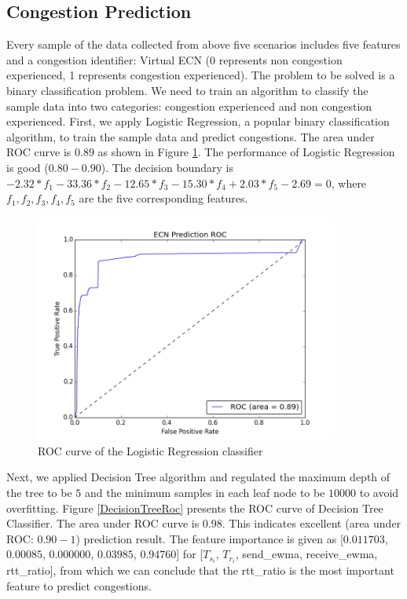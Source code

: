 \subsection{Congestion Prediction}
\label{CongestionPredict}
\par Every sample of the data collected from above five scenarios includes five features and a congestion identifier: Virtual ECN (0 represents non congestion experienced, 1 represents congestion experienced). The problem to be solved is a binary classification problem. We need to train an algorithm to classify the sample data into two categories: congestion experienced and non congestion experienced. First, we apply Logistic Regression, a popular binary classification algorithm, to train the sample data and predict congestions. The area under ROC curve is $0.89$ as shown in Figure \ref{LRRoc}. The performance of Logistic Regression is good ($0.80 - 0.90$). The decision boundary is $ -2.32*f_{1} - 33.36*f_{2} - 12.65*f_{3} - 15.30*f_{4} + 2.03*f_{5} - 2.69 = 0$, where $f_{1}, f_{2}, f_{3}, f_{4}, f_{5}$ are the five corresponding features.
\begin{figure}
\centering
\includegraphics[width=10cm]{LRRoc.png}
\caption{ROC curve of the Logistic Regression classifier}
\label{LRRoc}
\end{figure}




\par Next, we applied Decision Tree algorithm and regulated the maximum depth of the tree to be $5$ and the minimum samples in each leaf node to be $10000$ to avoid overfitting. Figure \ref{DecisionTreeRoc} presents the ROC curve of Decision Tree Classifier. The area under ROC curve is $0.98$. This indicates excellent (area under ROC: $0.90 - 1$) prediction result. The feature importance is given as [$0.011703$, $0.00085$, $0.000000$, $0.03985$, $0.94760$] for [$T_{s_{i}}$, $T_{r_{i}}$, send\_ewma, receive\_ewma, rtt\_ratio], from which we can conclude that the rtt\_ratio is the most important feature to predict congestions. 

